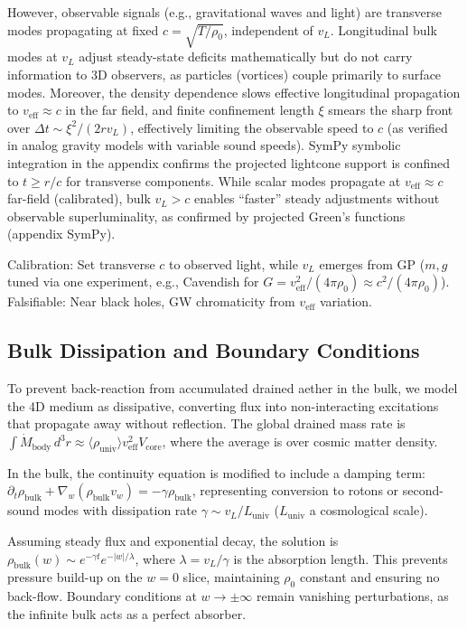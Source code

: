 \documentclass{article}
\begin{document}
However, observable signals (e.g., gravitational waves and light) are transverse modes propagating at fixed $c = \sqrt{T / \rho_0}$, independent of $v_L$. Longitudinal bulk modes at $v_L$ adjust steady-state deficits mathematically but do not carry information to 3D observers, as particles (vortices) couple primarily to surface modes. Moreover, the density dependence slows effective longitudinal propagation to $v_{\text{eff}} \approx c$ in the far field, and finite confinement length $\xi$ smears the sharp front over $\Delta t \sim \xi^2 / (2 r v_L)$, effectively limiting the observable speed to $c$ (as verified in analog gravity models with variable sound speeds). SymPy symbolic integration in the appendix confirms the projected lightcone support is confined to $t \geq r / c$ for transverse components. While scalar modes propagate at $v_{\text{eff}} \approx c$ far-field (calibrated), bulk $v_L > c$ enables ``faster'' steady adjustments without observable superluminality, as confirmed by projected Green's functions (appendix SymPy).

Calibration: Set transverse $c$ to observed light, while $v_L$ emerges from GP ($m, g$ tuned via one experiment, e.g., Cavendish for $G = v_{\text{eff}}^2 / (4\pi \rho_0) \approx c^2 / (4\pi \rho_0)$). Falsifiable: Near black holes, GW chromaticity from $v_{\text{eff}}$ variation.

\subsection{Bulk Dissipation and Boundary Conditions}

To prevent back-reaction from accumulated drained aether in the bulk, we model the 4D medium as dissipative, converting flux into non-interacting excitations that propagate away without reflection. The global drained mass rate is $\int \dot{M}_{\text{body}} \, d^3 r \approx \langle \rho_{\text{univ}} \rangle v_{\text{eff}}^2 V_{\text{core}}$, where the average is over cosmic matter density.

In the bulk, the continuity equation is modified to include a damping term: $\partial_t \rho_{\text{bulk}} + \nabla_w (\rho_{\text{bulk}} v_w) = -\gamma \rho_{\text{bulk}}$, representing conversion to rotons or second-sound modes with dissipation rate $\gamma \sim v_L / L_{\text{univ}}$ ($L_{\text{univ}}$ a cosmological scale).

Assuming steady flux and exponential decay, the solution is $\rho_{\text{bulk}}(w) \sim e^{-\gamma t} e^{-|w| / \lambda}$, where $\lambda = v_L / \gamma$ is the absorption length. This prevents pressure build-up on the $w=0$ slice, maintaining $\rho_0$ constant and ensuring no back-flow. Boundary conditions at $w \to \pm \infty$ remain vanishing perturbations, as the infinite bulk acts as a perfect absorber.
\end{document}
